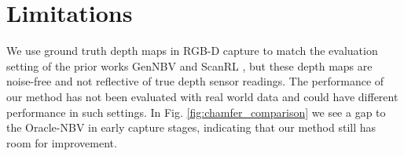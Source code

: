 \section{Limitations}
\label{sec:limitations}
\vspace{-0.25em}

We use ground truth depth maps in RGB-D capture to match the evaluation setting of the prior works GenNBV \cite{chen2024gennbv} and ScanRL \cite{peralta2020next}, but these depth maps are noise-free and not reflective of true depth sensor readings. The performance of our method has not been evaluated with real world data and could have different performance in such settings. In Fig. \ref{fig:chamfer_comparison} we see a gap to the Oracle-NBV in early capture stages, indicating that our method still has room for improvement.